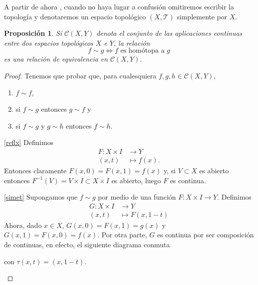 \documentclass[12pt,a4paper]{book}
\newtheorem{prop}[thm]{Proposición}
\theoremstyle{definition} \newtheorem{defn}[thm]{Definición}
\theoremstyle{definition} \newtheorem{ejemplo}[thm]{Ejemplo}
\theoremstyle{definition} \newtheorem{ejercicio}[thm]{Ejercicio}
\theoremstyle{remark} \newtheorem*{obs}{Observación}
\def\TT{\mathcal{T}}
\begin{document}
  A partir de ahora , cuando no haya lugar a confusión  omitiremos escribir la topología y denotaremos un espacio topológico $(X,\TT)$ simplemente por $X$.
  \begin{prop}\label{equivhomot}
  Si $\mathcal{C}(X,Y)$ denota el conjunto de las aplicaciones continuas entre dos espacios topológicos $X$ e $Y$, la relación
  \begin{equation*}
    f \sim g \Leftrightarrow f \text{ es homótopa a } g
  \end{equation*}
  es una relación de equivalencia en $\mathcal{C}(X,Y)$.
\end{prop}
\begin{proof}
  Tenemos que probar que, para cualesquiera $f,g,h \in \mathcal{C}(X,Y)$,
  \begin{enumerate}[label=(\alph*)]
    \item\label{reflx} $f \sim f$,
    \item\label{simet} si $f \sim g$ entonces $g\sim f$ y
    \item\label{trans} si $f\sim g$ y $g\sim h$ entonces $f\sim h$.
  \end{enumerate}

  \ref{reflx} Definimos
  \begin{align*}
    F :X\times I&\longrightarrow Y\\ 
      (x,t) &\longmapsto f(x). 
    \end{align*}
    Entonces claramente $F(x,0)=F(x,1)=f(x)$ y, si $V\subset X$ es abierto entonces $F^{-1}(V)=V\times I\subset X\times I$ es abierto, luego $F$ es continua.

    \ref{simet} Supongamos que $f\sim g$ por medio de una función $F:X\times I \rightarrow Y$. Definimos 
    \begin{align*}
      G :X\times I&\longrightarrow Y\\ 
        (x,t) &\longmapsto F(x,1-t) 
      \end{align*}
      Ahora, dado $x\in X$, $G(x,0)=F(x,1)=g(x)$ y $G(x,1)=F(x,0)=f(x)$. Por otra parte, $G$ es continua por ser composición de continuas, en efecto, el siguiente diagrama conmuta
      \begin{center}
con $\tau(x,t)=(x,1-t)$.
      \end{center}


\end{proof}
\end{document}
